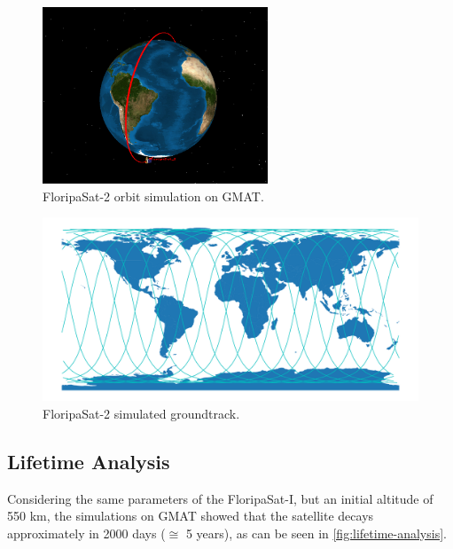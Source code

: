 \begin{figure}[!ht]
    \begin{center}
        \includegraphics[width=0.6\textwidth]{figures/fsat2-gmat.png}
        \caption{FloripaSat-2 orbit simulation on GMAT.}
        \label{fig:fsat2-gmat}
    \end{center}
\end{figure}

\begin{figure}[!ht]
    \begin{center}
        \includegraphics[width=\textwidth]{figures/fsat2-gmat-groundtrack.pdf}
        \caption{FloripaSat-2 simulated groundtrack.}
        \label{fig:fsat2-gmat-groundtrack}
    \end{center}
\end{figure}

\subsection{Lifetime Analysis}

Considering the same parameters of the FloripaSat-I, but an initial altitude of 550 km, the simulations on GMAT showed that the satellite decays approximately in 2000 days ($\cong$ 5 years), as can be seen in \autoref{fig:lifetime-analysis}.

